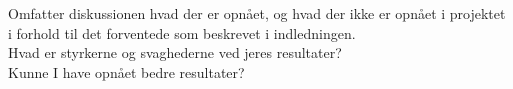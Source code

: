 Omfatter diskussionen hvad der er opnået, og hvad der ikke er opnået i projektet i forhold til det forventede som beskrevet i indledningen. \\
Hvad er styrkerne og svaghederne ved jeres resultater?\\
Kunne I have opnået bedre resultater?\\